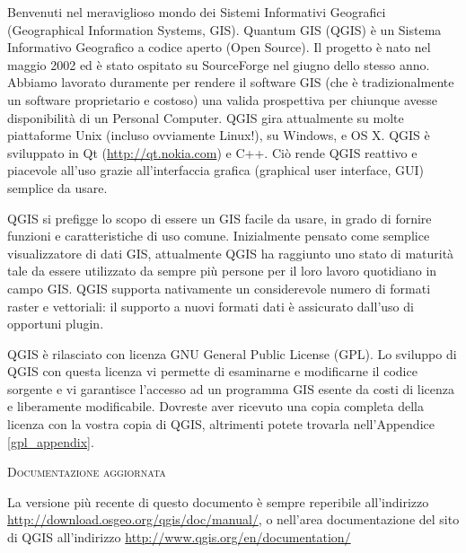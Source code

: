 \mainmatter
\pagestyle{scrheadings}
\label{label_forward}
\setcounter{page}{1}


Benvenuti nel meraviglioso mondo dei Sistemi Informativi Geografici (Geographical 
Information Systems, GIS). Quantum GIS (QGIS) è un Sistema Informativo Geografico 
a codice aperto (Open Source). Il progetto è nato nel maggio 2002 ed è stato 
ospitato su SourceForge nel giugno dello stesso anno. Abbiamo lavorato duramente 
per rendere il software GIS (che è tradizionalmente un software proprietario e costoso) 
una valida prospettiva per chiunque avesse disponibilità di un Personal Computer. 
QGIS gira attualmente su molte piattaforme Unix (incluso ovviamente Linux!), su 
Windows, e OS X. QGIS è sviluppato in Qt  (\url{http://qt.nokia.com}) e C++. 
Ciò rende QGIS reattivo e piacevole all’uso grazie all’interfaccia grafica 
(graphical user interface, GUI) semplice da usare.

QGIS si prefigge lo scopo di essere un GIS facile da usare, in grado di fornire 
funzioni e caratteristiche di uso comune. Inizialmente pensato come semplice
visualizzatore di dati GIS, attualmente QGIS ha raggiunto uno stato di maturità
tale da essere utilizzato da sempre più persone per il loro lavoro quotidiano in campo GIS. 
QGIS supporta nativamente un considerevole numero di formati raster e vettoriali: 
il supporto a nuovi formati dati è assicurato dall'uso di opportuni plugin.

QGIS è rilasciato con licenza GNU General Public License (GPL). Lo sviluppo di QGIS 
con questa licenza vi permette di esaminarne e modificarne il codice sorgente e vi
garantisce l'accesso ad un programma GIS esente da costi di licenza e  
liberamente modificabile. Dovreste aver ricevuto una copia completa della licenza 
con la vostra copia di QGIS, altrimenti potete trovarla nell’Appendice \ref{gpl_appendix}.  

\begin{Tip}\caption{\textsc{Documentazione aggiornata}}
La versione più recente di questo documento è sempre reperibile all’indirizzo
\url{http://download.osgeo.org/qgis/doc/manual/}, o nell’area documentazione 
del sito di QGIS all’indirizzo \url{http://www.qgis.org/en/documentation/}
\end{Tip}

